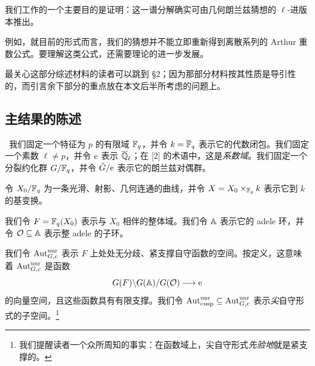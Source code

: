 我们工作的一个主要目的是证明：这一谱分解确实可由几何朗兰兹猜想的 $\ell$-进版本推出。


例如，就目前的形式而言，我们的猜想并不能立即重新得到离散系列的 Arthur 重数公式。要理解这类公式，还需要理论的进一步发展。



最关心这部分综述材料的读者可以跳到 §2；因为那部分材料按其性质是导引性的，而引言余下部分的重点放在本文后半所考虑的问题上。

\subsection{主结果的陈述}

\ 我们固定一个特征为 $p$ 的有限域 $\mathbb{F}_q$，并令 $k = \overline{\mathbb{F}}_q$ 表示它的代数闭包。我们固定一个素数 $\ell \neq p$，并令 $\mathrm{e}$ 表示 $\overline{\mathbb{Q}}_\ell$；在 [2] 的术语中，这是\emph{系数域}。我们固定一个分裂约化群 $G/\mathbb{F}_q$，并令 $\check{G}/\mathrm{e}$ 表示它的朗兰兹对偶群。

令 $X_0/\mathbb{F}_q$ 为一条光滑、射影、几何连通的曲线，并令 $X = X_0 \times_{\mathbb{F}_q} k$ 表示它到 $k$ 的基变换。

我们令 $F = \mathbb{F}_q(X_0)$ 表示与 $X_0$ 相伴的整体域。我们令 $\mathbb{A}$ 表示它的 adele 环，并令 $\mathcal{O} \subseteq \mathbb{A}$ 表示整 adele 的子环。

我们令 $\operatorname{Aut}^{\mathrm{unr}}_{G,c}$ 表示 $F$ 上处处无分歧、紧支撑自守函数的空间。按定义，这意味着 $\operatorname{Aut}^{\mathrm{unr}}_{G,c}$ 是函数
\[
  G(F)\backslash G(\mathbb{A})/G(\mathcal{O}) \longrightarrow \mathrm{e}
\]
的向量空间，且这些函数具有有限支撑。我们令 $\operatorname{Aut}^{\mathrm{unr}}_{\mathrm{cusp}} \subseteq \operatorname{Aut}^{\mathrm{unr}}_{G,c}$ 表示\emph{尖}自守形式的子空间。\footnote{我们提醒读者一个众所周知的事实：在函数域上，尖自守形式\emph{先验地}就是紧支撑的。}


